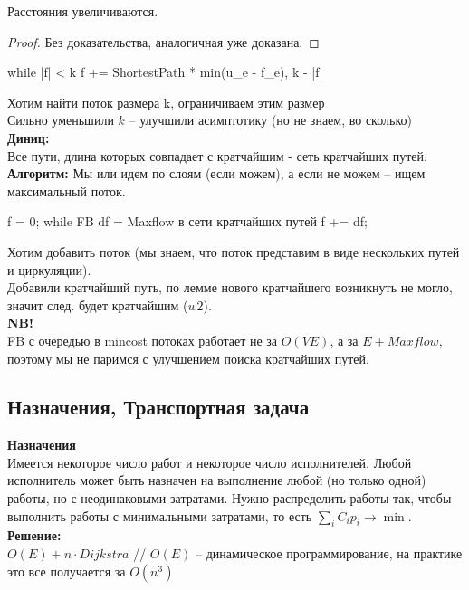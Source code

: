 \begin{lemma}
	Расстояния увеличиваются.
\end{lemma}
\begin{proof}
	Без доказательства, аналогичная уже доказана.
\end{proof}

\begin{cppcode}
	while |f| < k
		f += ShortestPath * min(u_e - f_e), k - |f| 
\end{cppcode}
Хотим найти поток размера k, ограничиваем этим размер\\
Сильно уменьшили $k$ -- улучшили асимптотику (но не знаем, во сколько)\\

{\bfseries Диниц:}\\
Все пути, длина которых совпадает с кратчайшим - сеть кратчайших путей.\\
{\bfseries Алгоритм:}
Мы или идем по слоям (если можем), а если не можем -- ищем максимальный поток.
\begin{cppcode}
	f = 0;
	while FB
		df = Maxflow в сети кратчайших путей
	f += df;
\end{cppcode}

Хотим добавить поток (мы знаем, что поток представим в виде нескольких путей и циркуляции).\\
Добавили кратчайший путь, по лемме нового кратчайшего возникнуть не могло, значит след. будет кратчайшим ($w2$).\\
{\bfseries NB!}\\
FB с очередью в mincost потоках работает не за $O(VE)$, а за $E + Maxflow$, поэтому мы не паримся с улучшением поиска кратчайших путей.\\

\subsection{Назначения, Транспортная задача}
{\bfseries Назначения} \\
Имеется некоторое число работ и некоторое число исполнителей. Любой исполнитель может быть назначен на выполнение любой (но только одной) работы, но с неодинаковыми затратами. 
Нужно распределить работы так, чтобы выполнить работы с минимальными затратами, то есть $\sum_i C_ip_i \to \min$.\\
{\bfseries Решение:}\\
$O(E) + n\cdot Dijkstra$ // $O(E)$ -- динамическое программирование, на практике это все получается за $O(n^3)$\\

